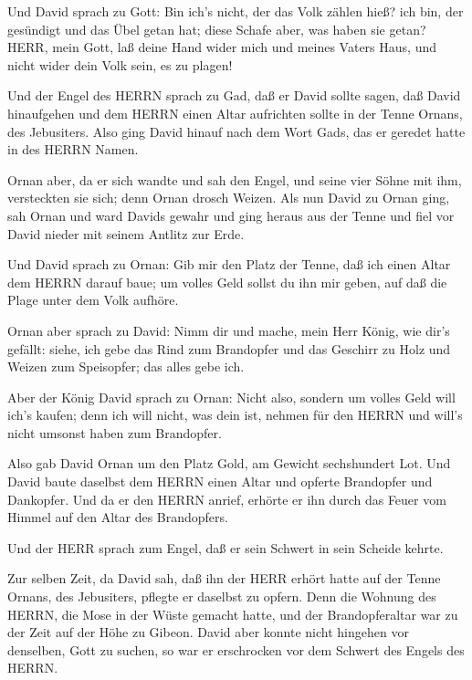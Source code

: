  Und David sprach zu Gott: Bin ich's nicht, der das Volk
zählen hieß? ich bin, der gesündigt und das Übel getan hat; diese Schafe
aber, was haben sie getan? HERR, mein Gott, laß deine Hand wider mich
und meines Vaters Haus, und nicht wider dein Volk sein, es zu plagen!

 Und der Engel des HERRN sprach zu Gad, daß er David sollte
sagen, daß David hinaufgehen und dem HERRN einen Altar aufrichten sollte
in der Tenne Ornans, des Jebusiters.  Also ging David
hinauf nach dem Wort Gads, das er geredet hatte in des HERRN Namen.

 Ornan aber, da er sich wandte und sah den Engel, und seine
vier Söhne mit ihm, versteckten sie sich; denn Ornan drosch Weizen.
 Als nun David zu Ornan ging, sah Ornan und ward Davids
gewahr und ging heraus aus der Tenne und fiel vor David nieder mit
seinem Antlitz zur Erde.

 Und David sprach zu Ornan: Gib mir den Platz der Tenne,
daß ich einen Altar dem HERRN darauf baue; um volles Geld sollst du ihn
mir geben, auf daß die Plage unter dem Volk aufhöre.

 Ornan aber sprach zu David: Nimm dir und mache, mein Herr
König, wie dir's gefällt: siehe, ich gebe das Rind zum Brandopfer und
das Geschirr zu Holz und Weizen zum Speisopfer; das alles gebe ich.

 Aber der König David sprach zu Ornan: Nicht also, sondern
um volles Geld will ich's kaufen; denn ich will nicht, was dein ist,
nehmen für den HERRN und will's nicht umsonst haben zum Brandopfer.

 Also gab David Ornan um den Platz Gold, am Gewicht
sechshundert Lot.  Und David baute daselbst dem HERRN einen
Altar und opferte Brandopfer und Dankopfer. Und da er den HERRN anrief,
erhörte er ihn durch das Feuer vom Himmel auf den Altar des Brandopfers.

 Und der HERR sprach zum Engel, daß er sein Schwert in sein
Scheide kehrte.

 Zur selben Zeit, da David sah, daß ihn der HERR erhört
hatte auf der Tenne Ornans, des Jebusiters, pflegte er daselbst zu
opfern.  Denn die Wohnung des HERRN, die Mose in der Wüste
gemacht hatte, und der Brandopferaltar war zu der Zeit auf der Höhe zu
Gibeon.  David aber konnte nicht hingehen vor denselben,
Gott zu suchen, so war er erschrocken vor dem Schwert des Engels des
HERRN.

